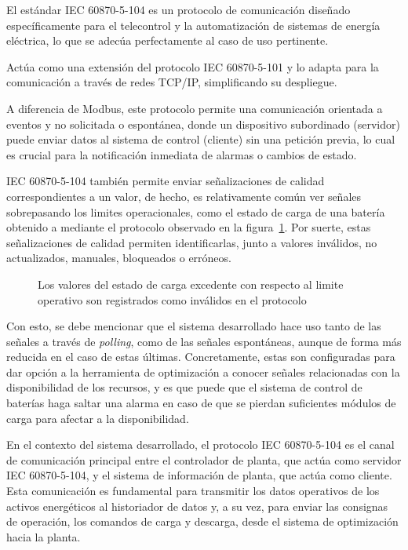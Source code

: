 El estándar IEC 60870-5-104 es un protocolo de comunicación diseñado específicamente para el telecontrol y la automatización de sistemas de energía eléctrica, lo que se adecúa perfectamente al caso de uso pertinente.

Actúa como una extensión del protocolo IEC 60870-5-101 y lo adapta para la comunicación a través de redes TCP/IP, simplificando su despliegue.

A diferencia de Modbus, este protocolo permite una comunicación orientada a eventos y no solicitada o espontánea, donde un dispositivo subordinado (servidor) puede enviar datos al sistema de control (cliente) sin una petición previa, lo cual es crucial para la notificación inmediata de alarmas o cambios de estado.

IEC 60870-5-104 también permite enviar señalizaciones de calidad correspondientes a un valor, de hecho, es relativamente común ver señales sobrepasando los limites operacionales, como el estado de carga de una batería obtenido a mediante el protocolo observado en la figura~\ref{fig:overflow-soc}. Por suerte, estas señalizaciones de calidad permiten identificarlas, junto a valores inválidos, no actualizados, manuales, bloqueados o erróneos.

\begin{figure}
\centering
\caption{Los valores del estado de carga excedente con respecto al limite operativo son registrados como inválidos en el protocolo}
\label{fig:overflow-soc}
\end{figure}

Con esto, se debe mencionar que el sistema desarrollado hace uso tanto de las señales a través de \textit{polling}, como de las señales espontáneas, aunque de forma más reducida en el caso de estas últimas. Concretamente, estas son configuradas para dar opción a la herramienta de optimización a conocer señales relacionadas con la disponibilidad de los recursos, y es que puede que el sistema de control de baterías haga saltar una alarma en caso de que se pierdan suficientes módulos de carga para afectar a la disponibilidad.

En el contexto del sistema desarrollado, el protocolo IEC 60870-5-104 es el canal de comunicación principal entre el controlador de planta, que actúa como servidor IEC 60870-5-104, y el sistema de información de planta, que actúa como cliente. Esta comunicación es fundamental para transmitir los datos operativos de los activos energéticos al historiador de datos y, a su vez, para enviar las consignas de operación, los comandos de carga y descarga, desde el sistema de optimización hacia la planta.

